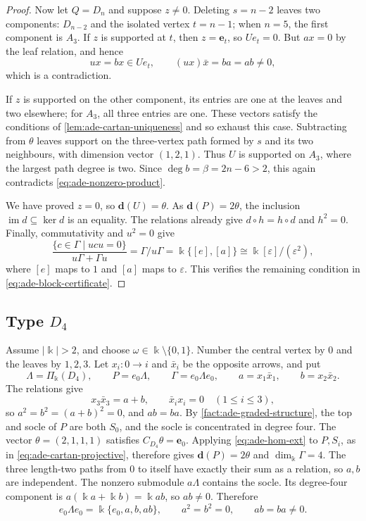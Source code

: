 \documentclass[a4paper,11pt,reqno]{amsart}
\theoremstyle{definition}
\theoremstyle{plain}
\numberwithin{equation}{section}
\newcommand{\im}{\operatorname{im}}
\newcommand{\kk}{\Bbbk}
\begin{document}
\begin{proof}
Now let \(Q=D_n\) and suppose \(z\ne0\).
Deleting \(s=n-2\) leaves two components: \(D_{n-2}\) and the
isolated vertex \(t=n-1\); when \(n=5\), the first component
is \(A_3\).
If \(z\) is supported at \(t\), then
\(z=\mathbf e_t\), so \(Ue_t=0\).
But \(ax=0\) by the leaf relation, and hence
\[
 ux=bx\in Ue_t,\qquad (ux)\bar x=ba=ab\ne0,
\]
which is a contradiction.

If \(z\) is supported on the other component, its entries are
one at the leaves and two elsewhere; for \(A_3\), all three
entries are one.  These vectors satisfy the conditions of
\cref{lem:ade-cartan-uniqueness} and so exhaust this case.
Subtracting from \(\theta\) leaves support on the three-vertex
path formed by \(s\) and its two neighbours, with dimension
vector \((1,2,1)\).  Thus \(U\) is supported on \(A_3\),
where the largest path degree is two.
Since \(\deg b=\beta=2n-6>2\), this again contradicts
\eqref{eq:ade-nonzero-product}.

We have proved \(z=0\), so \(\mathbf d(U)=\theta\).
As \(\mathbf d(P)=2\theta\), the inclusion
\(\im d\subseteq\ker d\) is an equality.
The relations already give \(d\circ h=h\circ d\) and \(h^2=0\).
Finally, commutativity and \(u^2=0\) give
\[
 \frac{\{c\in\Gamma\mid ucu=0\}}{u\Gamma+\Gamma u}
 =\Gamma/u\Gamma
 =\kk\{[e],[a]\}
 \cong\kk[\varepsilon]/(\varepsilon^2),
\]
where \([e]\) maps to \(1\) and \([a]\) maps to
\(\varepsilon\).  This verifies the remaining condition in
\eqref{eq:ade-block-certificate}.
\end{proof}
\subsection{Type \texorpdfstring{$D_4$}{D4}}

Assume \(|\kk|>2\), and choose \(\omega\in\kk\setminus\{0,1\}\).
Number the central vertex by \(0\)
and the leaves by \(1,2,3\).  Let \(x_i:0\to i\) and \(\bar x_i\)
be the opposite arrows, and put
\[
 \Lambda=\Pi_\kk(D_4),\qquad P=e_0\Lambda,\qquad
 \Gamma=e_0\Lambda e_0,\qquad
 a=x_1\bar x_1,\qquad b=x_2\bar x_2.
\]
The relations give
\[
 x_3\bar x_3=a+b,\qquad \bar x_i x_i=0\quad(1\le i\le3),
\]
so \(a^2=b^2=(a+b)^2=0\), and \(ab=ba\).
By \cref{fact:ade-graded-structure}, the top and socle of \(P\)
are both \(S_0\), and the socle is concentrated in degree four.
The vector \(\theta=(2,1,1,1)\) satisfies
\(C_{D_4}\theta=\mathbf e_0\).
Applying \eqref{eq:ade-hom-ext} to \(P,S_i\), as in
\eqref{eq:ade-cartan-projective}, therefore gives
\(\mathbf d(P)=2\theta\) and \(\dim_\kk\Gamma=4\).
The three length-two paths from \(0\) to itself have exactly their sum as a
relation, so \(a,b\) are independent.  The nonzero submodule
\(a\Lambda\) contains the socle.  Its degree-four component is
\(a(\kk a+\kk b)=\kk ab\), so \(ab\ne0\).  Therefore
\[
 e_0\Lambda e_0=\kk\{e_0,a,b,ab\},
 \qquad a^2=b^2=0,\qquad ab=ba\ne0.
\]
\end{document}
